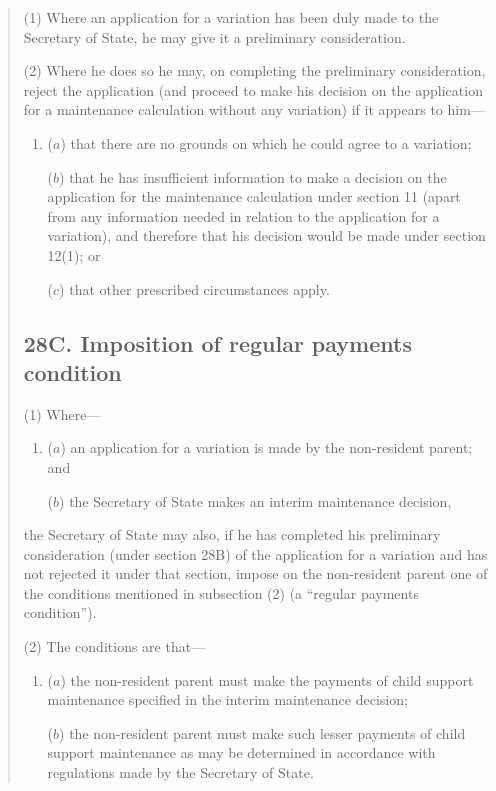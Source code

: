 \documentclass[12pt,a4paper]{article}
\begin{document}
\begin{quotation}
(1) Where an application for a variation has been duly made to the Secretary of State, he may give it a preliminary consideration.

(2) Where he does so he may, on completing the preliminary consideration, reject the application (and proceed to make his decision on the application for a maintenance calculation without any variation) if it appears to him—
\begin{enumerate}\item[]
($a$) that there are no grounds on which he could agree to a variation;

($b$) that he has insufficient information to make a decision on the application for the maintenance calculation under section 11 (apart from any information needed in relation to the application for a variation), and therefore that his decision would be made under section 12(1); or

($c$) that other prescribed circumstances apply.
\end{enumerate}

\subsection*{28C. Imposition of regular payments condition}

(1) Where—
\begin{enumerate}\item[]
($a$) an application for a variation is made by the non-resident parent; and

($b$) the Secretary of State makes an interim maintenance decision,
\end{enumerate}
the Secretary of State may also, if he has completed his preliminary consideration (under section 28B) of the application for a variation and has not rejected it under that section, impose on the non-resident parent one of the conditions mentioned in subsection (2)  (a “regular payments condition”).

(2) The conditions are that—
\begin{enumerate}\item[]
($a$) the non-resident parent must make the payments of child support maintenance specified in the interim maintenance decision;

($b$) the non-resident parent must make such lesser payments of child support maintenance as may be determined in accordance with regulations made by the Secretary of State.
\end{enumerate}


\end{quotation}
\end{document}
